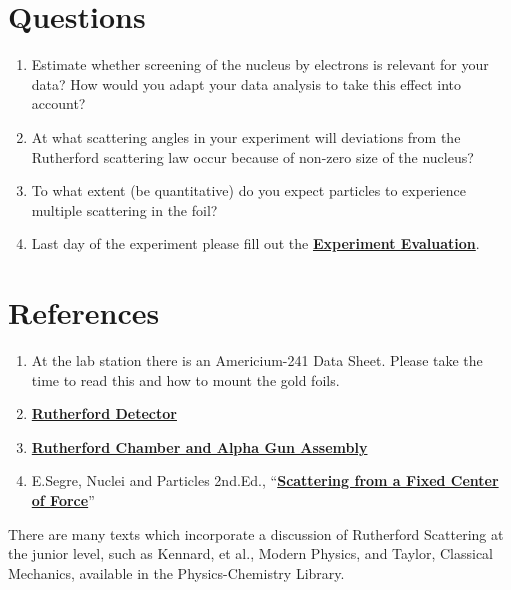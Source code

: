 \documentclass{../lab}
\begin{document}
\section{Questions}

\begin{enumerate}
    \item Estimate whether screening of the nucleus by electrons is relevant for your data? How would you adapt your data analysis to take this effect into account?

    \item At what scattering angles in your experiment will deviations from the Rutherford scattering law occur because of non-zero size of the nucleus?

    \item To what extent (be quantitative) do you expect \textalpha{} particles to experience multiple scattering in the foil?

    \item Last day of the experiment please fill out the \href{\ExperimentEvaluation}{\textbf{Experiment Evaluation}}.

\end{enumerate}



\section{References}
\label{sec:References}

\begin{enumerate}
    \item At the lab station there is an Americium-241 Data Sheet. Please take the time to read this and how to mount the gold foils.

    \item
    \href{https://drive.google.com/file/d/10P4Wneg-a9OkbNQRQvUf4y5rwyXPG_p0/view?usp=drive_link}{\textbf{Rutherford Detector}}

    \item   \href{https://drive.google.com/file/d/1PBHl9fVhZDgeoZGVGwaQ1tZrCZBu5B86/view?usp=drive_link}{\textbf{Rutherford Chamber and Alpha Gun Assembly}}

    \item E.Segre, Nuclei and Particles 2nd.Ed., ``\href{https://drive.google.com/file/d/1etYGfidfuYwDUIOcE5RUqa3y55lfk5Dv/view?usp=drive_link}{\textbf{Scattering from a Fixed Center of Force}}''

\end{enumerate}

There are many texts which incorporate a discussion of Rutherford Scattering at the junior level, such as Kennard, et al., Modern Physics, and Taylor, Classical Mechanics, available in the Physics-Chemistry Library.
\end{document}
